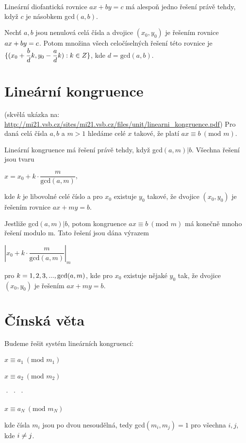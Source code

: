 \documentclass{szzclass}
\begin{document}
Lineární diofantická rovnice $ax + by = c$ má alespoň jedno řešení právě
tehdy, když $c$ je násobkem gcd$(a, b)$.

Nechť $a, b$ jsou nenulová celá čísla a dvojice $(x_0, y_0)$ je řešením rovnice
$ax +\nolinebreak by =\nolinebreak c$. Potom množina všech celočíselných řešení této rovnice je
$\{(x_0 +\dfrac{b}{d}k, y_0 -\dfrac{a}{d}k) :\nolinebreak k \in\nolinebreak Z\}$, kde $d = \text{gcd}(a, b)$.


\section{Lineární kongruence}
(skvělá ukázka na: \url{http://mi21.vsb.cz/sites/mi21.vsb.cz/files/unit/linearni_kongruence.pdf})
Pro daná celá čísla $a, b$ a $m > 1$ hledáme
celé $x$ takové, že platí $ax \equiv b~(\text{mod } m)$.

Lineární kongruence má řešení právě tehdy, když gcd$(a, m)|b$. Všechna
řešení jsou tvaru 
\begin{center}
$x = x_0 + k ·\dfrac{m}{\text{gcd}(a, m)}$,
\end{center}
kde $k$ je libovolné celé číslo a pro $x_0$ existuje $y_0$ takové, že dvojice $(x_0, y_0)$
je řešením rovnice $ax + my = b$.


Jestliže gcd$(a, m)|b$, potom kongruence $ax \equiv b~(\text{mod } m)$ má konečně
mnoho řešení modulo m. Tato řešení jsou dána výrazem
\begin{center}
$|x_0 + k ·\dfrac{m}{\text{gcd}(a, m)}|_m$
\end{center}
pro $k =\nolinebreak 1, 2, 3, . . . , \text{gcd}(a, m)$, kde pro $x_0$ existuje nějaké $y_0$ tak, že dvojice
$(x_0, y_0)$ je řešením $ax + my = b$.

\newpage

\section{Čínská věta}

Budeme řešit systém lineárních kongruencí:
\begin{center}
$x \equiv a_1~(\text{mod } m_1)$

$x \equiv a_2~(\text{mod } m_2)$

· · ·

$x \equiv a_N~(\text{mod } m_N )$

\end{center}
kde čísla $m_i$ jsou po dvou nesoudělná, tedy gcd$(m_i, m_j ) = 1$ pro všechna $i, j$, kde $i \neq\nolinebreak j$.
\end{document}

